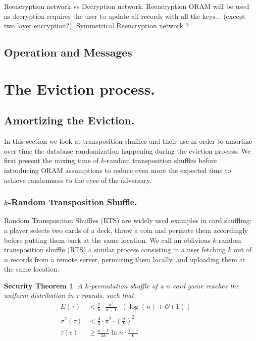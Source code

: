 \documentclass[a4paper]{article}
\newtheorem{secthm}{Security Theorem}
\begin{document}
Reencryption network vs Decryption network. Reencryption ORAM will be used as decryption requires the user to update all records with all the keys... (except two layer encryption?).
Symmetrical Reencryption network ?

\subsection{Operation and Messages}
\section{The Eviction process.}
\subsection{Amortizing the Eviction.}
In this section we look at transposition shuffles and their use in order to amortize over time the database randomization happening during the eviction process.
We first present the mixing time of $k$-random transposition shuffles before introducing ORAM assumptions to reduce even more the expected time to achieve randomness to the eyes of the adversary.

\subsubsection{$k$-Random Transposition Shuffle.}
Random Transposition Shuffles (RTS) are widely used examples in card shuffling: a player selects two cards of a deck, throw a coin and permute them accordingly before putting them back at the same location.
We call an oblivious $k$-random transposition shuffle (RTS) a similar process consisting in a user fetching $k$ out of $n$ records from a remote server, permuting them locally, and uploading them at the same location.

\begin{secthm}
A $k$-permutation shuffle of a $n$ card game reaches the uniform distribution in $\tau$ rounds, such that
\begin{align*}
E(\tau) &< \frac{2}{k}\cdot\frac{n^2}{n+1}\cdot \left ( \log(n) + \mathcal{O}(1) \right ) &\\
\sigma^2(\tau) &< \frac{4}{3} \cdot {\pi}^2 \cdot \left ( \frac{n}{k} \right )^2 &\\
\tau\left (\epsilon \right ) &\geq \frac{n-1}{2k} \ln{n\cdot \frac{1-\epsilon}{6}}&
\end{align*}
\end{secthm}
\end{document}
